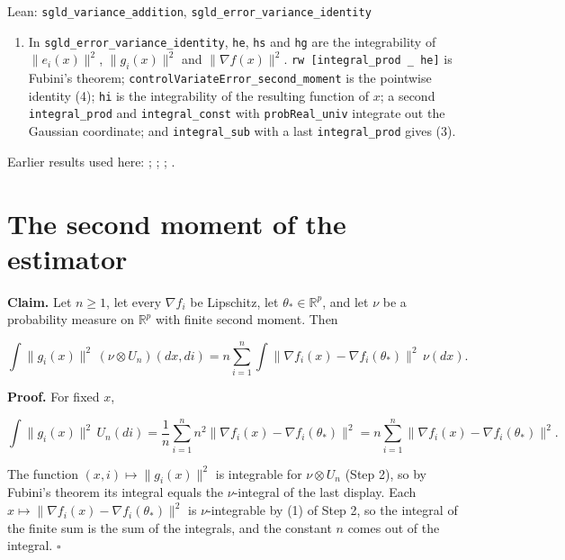 \documentclass[11pt,a4paper]{article}
\begin{document}
\begin{leanbox}{Lean: \texttt{sgld\_\allowbreak{}variance\_\allowbreak{}addition}, \texttt{sgld\_\allowbreak{}error\_\allowbreak{}variance\_\allowbreak{}identity}}
\begin{enumerate}
\item In \texttt{sgld\_\allowbreak{}error\_\allowbreak{}variance\_\allowbreak{}identity}, \texttt{he}, \texttt{hs} and \texttt{hg} are the integrability of \(\|e_i(x)\|^2\), \(\|g_i(x)\|^2\) and \(\|\nabla f(x)\|^2\). \texttt{rw [integral\_\allowbreak{}prod \_\allowbreak{} he]} is Fubini's theorem; \texttt{control\allowbreak{}Variate\allowbreak{}Error\_\allowbreak{}second\_\allowbreak{}moment} is the pointwise identity (4); \texttt{hi} is the integrability of the resulting function of \(x\); a second \texttt{integral\_\allowbreak{}prod} and \texttt{integral\_\allowbreak{}const} with \texttt{prob\allowbreak{}Real\_\allowbreak{}univ} integrate out the Gaussian coordinate; and \texttt{integral\_\allowbreak{}sub} with a last \texttt{integral\_\allowbreak{}prod} gives (3).

\end{enumerate}
\end{leanbox}


Earlier results used here: \cite[Section~3.17.4]{LangevinLean2026ULASC}; \cite[Section~3.34.1]{LangevinLean2026ULASC}; \cite[Section~3.36.5]{LangevinLean2026ULASC}; \cite[Section~3.36.7]{LangevinLean2026ULASC}.

\section{\texorpdfstring{The second moment of the estimator}{The second moment of the estimator}}


\textbf{Claim.} Let \(n\ge1\), let every \(\nabla f_i\) be Lipschitz, let \(\theta_*\in\mathbb R^p\), and let \(\nu\) be a probability measure on \(\mathbb R^p\) with finite second moment. Then


\[\int\|g_i(x)\|^2\,(\nu\otimes U_n)(dx,di)=n\sum_{i=1}^n\int\|\nabla f_i(x)-\nabla f_i(\theta_*)\|^2\,\nu(dx).\]


\textbf{Proof.} For fixed \(x\),


\[\int\|g_i(x)\|^2\,U_n(di)=\frac1n\sum_{i=1}^n n^2\|\nabla f_i(x)-\nabla f_i(\theta_*)\|^2=n\sum_{i=1}^n\|\nabla f_i(x)-\nabla f_i(\theta_*)\|^2.\]


The function \((x,i)\mapsto\|g_i(x)\|^2\) is integrable for \(\nu\otimes U_n\) (Step 2), so by Fubini's theorem its integral equals the \(\nu\)-integral of the last display. Each \(x\mapsto\|\nabla f_i(x)-\nabla f_i(\theta_*)\|^2\) is \(\nu\)-integrable by (1) of Step 2, so the integral of the finite sum is the sum of the integrals, and the constant \(n\) comes out of the integral. \(\square\)
\end{document}
